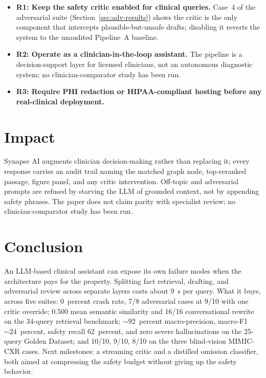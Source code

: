 \documentclass[twocolumn,10pt,main=USenglish]{asmeconf}
\begin{document}
\begin{itemize}
\item \textbf{R1: Keep the safety critic enabled for clinical
queries.} Case~4 of the adversarial suite
(Section~\ref{sec:adv-results}) shows the critic is the only
component that intercepts plausible-but-unsafe drafts; disabling
it reverts the system to the unaudited Pipeline~A baseline.
\item \textbf{R2: Operate as a clinician-in-the-loop assistant.}
The pipeline is a decision-support layer for licensed clinicians,
not an autonomous diagnostic system; no clinician-comparator study
has been run.
\item \textbf{R3: Require PHI redaction or HIPAA-compliant
hosting before any real-clinical deployment.}
\end{itemize}

\section{Impact}
\label{sec:impact}
Synapse AI augments clinician decision-making rather than replacing
it; every response carries an audit trail naming the matched graph
node, top-reranked passage, figure panel, and any critic
intervention. Off-topic and adversarial prompts are refused by
starving the LLM of grounded context, not by appending safety
phrases. The paper does not claim parity with specialist review;
no clinician-comparator study has been run.

\section{Conclusion}
An LLM-based clinical assistant can expose its own failure modes
when the architecture pays for the property. Splitting fact
retrieval, drafting, and adversarial review across separate layers
costs about \num{9}~s per query. What it buys, across five suites:
\num{0}~percent crash rate, \num{7}/\num{8} adversarial cases at
\num{9}/\num{10} with one critic override; \num{0.500} mean
semantic similarity and \num{16}/\num{16} conversational rewrite on
the \num{34}-query retrieval benchmark; ${\sim}\num{92}$~percent
macro-precision, macro-F1 ${\sim}\num{24}$~percent, safety recall
\num{62}~percent, and zero severe hallucinations on the
\num{25}-query Golden Dataset; and \num{10}/\num{10},
\num{9}/\num{10}, \num{8}/\num{10} on the three blind-vision
MIMIC-CXR cases. Next milestones: a streaming critic and a
distilled omission classifier, both aimed at compressing the
safety budget without giving up the safety behavior.
\end{document}
